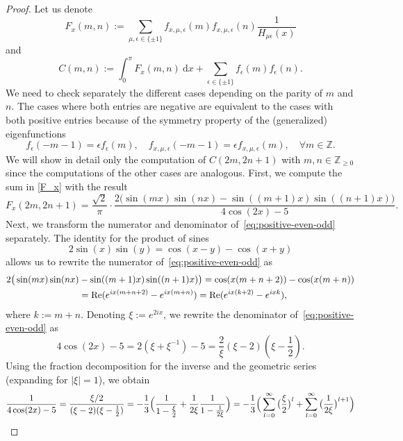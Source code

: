 \documentclass[10pt,a4paper]{amsart}
\newcommand{\Z}{\mathbb{Z}}
\begin{document}
\begin{proof}
 Let us denote
\begin{equation}
 F_x(m,n):=\sum_{\mu,\epsilon\in\{\pm1\}}f_{x,\mu,\epsilon}(m)f_{x,\mu,\epsilon}(n)\frac{1}{H_{\mu\epsilon}(x)} \label{F_x}
\end{equation}
 and
\begin{equation}
  C(m,n):=\int_0^\pi F_x(m,n) \ \mathrm{d}x +\sum_{\epsilon\in\{\pm1\}}f_\epsilon(m)f_\epsilon(n). \label{C_x}
\end{equation}
 We need to check separately the different cases depending on the parity of $m$ and $n$. 
The cases where both entries are negative are equivalent to the cases with both positive entries because of the symmetry property of the (generalized) eigenfunctions
$$
f_\epsilon(-m-1)=\epsilon f_\epsilon(m), \quad f_{x,\mu, \epsilon}(-m-1)=\epsilon f_{x,\mu, \epsilon}(m), \quad \forall m\in\Z.
$$
We will show in detail only the computation of $C(2m,2n+1)$ with $m,n\in\Z_{\ge0}$ since 
the computations of the other cases are analogous.
First, we compute the sum in \eqref{F_x} with the result
\begin{equation}\label{eq:positive-even-odd}
F_x(2m,2n+1)=\frac{\sqrt{2}}{\pi} \cdot \frac{2\big( \sin(mx)\sin(nx)-\sin((m+1)x)\sin((n+1)x)\big)}{4\cos(2x)-5}.
\end{equation}
Next, we transform  the numerator and denominator of~\eqref{eq:positive-even-odd} separately. The identity for the product of sines
$$
2\sin(x)\sin(y)=\cos(x-y)-\cos(x+y)
$$
allows us to rewrite the numerator of~\eqref{eq:positive-even-odd}  as
\begin{align}
 2\big( \sin(mx)\sin(nx) & -\sin((m+1)x)\sin((n+1)x)\big) = \cos(x(m+n+2))-\cos(x(m+n)) \notag \\
 & = \operatorname{Re}(e^{ix(m+n+2)}-e^{ix(m+n)}) = \operatorname{Re}(e^{ix(k+2)}-e^{ixk}), \label{num_ee}
\end{align}
where $k:=m+n$.
Denoting $\xi:=e^{2ix}$, we rewrite the denominator of~\eqref{eq:positive-even-odd}  as
$$
4\cos(2x)-5=2(\xi+\xi^{-1})-5=\frac{2}{\xi}(\xi-2)(\xi-\frac{1}{2}).
$$
Using the fraction decomposition for the inverse and the geometric series (expanding for $|\xi|=1$), we obtain
\begin{align}
 \frac{1}{4\cos(2x)-5} &=\frac{\xi/2}{(\xi-2)(\xi-\frac{1}{2})} 
=-\frac{1}{3}\Big(\frac{1}{1-\frac{\xi}{2}}+\frac{1}{2\xi}\frac{1}{1-\frac{1}{2\xi}}\Big) =-\frac{1}{3}\Big(\sum_{l=0}^{\infty}\big(\frac{\xi}{2}\big)^l + \sum_{l=0}^{\infty} \big(\frac{1}{2\xi}\big)^{l+1} \Big) \notag \\ 

\end{align}
\end{proof}
\end{document}
